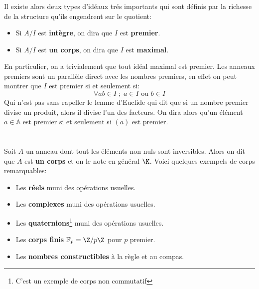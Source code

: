 \subsection*{}
Il existe alors deux types d'idéaux trés importants qui sont définis par la richesse de la structure qu'ils engendrent sur le quotient:
\begin{itemize}
   \item Si \( A/I \) est \textbf{intègre}, on dira que \( I \) est \textbf{premier}.
   \item Si \( A/I \) est \textbf{un corps}, on dira que \( I \) est \textbf{maximal}.
\end{itemize}
En particulier, on a trivialement que tout idéal maximal est premier. Les anneaux premiers sont un parallèle direct avec les nombres premiers, en effet on peut montrer que \( I \) est premier si et seulement si:
\[ 
   \forall ab \in I \; ; \; a \in I \text{ ou } b \in I 
\]
Qui n'est pas sans rapeller le lemme d'Euclide qui dit que si un nombre premier divise un produit, alors il divise l'un des facteurs. On dira alors qu'un élément \( a \in \mathbb{A} \) est premier si et seulement si \( (a) \) est premier.
\subsection*{}

\chapter*{}

\chapter*{}
Soit \(A\) un anneau dont tout les éléments non-nuls sont inversibles. Alors on dit que \(A\) est \textbf{un corps} et on le note en général \(\K\). Voici quelques exempels de corps remarquables:
\begin{itemize}
   \item Les \textbf{réels} muni des opérations usuelles.
   \item Les \textbf{complexes} muni des opérations usuelles.
   \item Les \textbf{quaternions}\footnote[1]{C'est un exemple de corps non commutatif} muni des opérations usuelles.
   \item Les \textbf{corps finis} \(\mathbb{F}_p = \Z/p\Z\) pour \(p\) premier.
   \item Les \textbf{nombres constructibles} à la règle et au compas.
\end{itemize}
